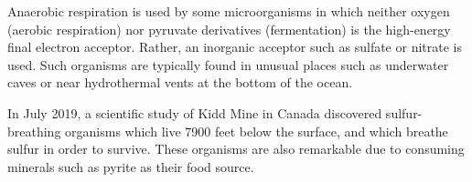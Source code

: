 Anaerobic respiration is used by some microorganisms in which neither oxygen (aerobic respiration) nor pyruvate derivatives (fermentation) is the high-energy final electron acceptor. Rather, an inorganic acceptor such as sulfate or nitrate is used. Such organisms are typically found in unusual places such as underwater caves or near hydrothermal vents at the bottom of the ocean.

In July 2019, a scientific study of Kidd Mine in Canada discovered sulfur-breathing organisms which live 7900 feet below the surface, and which breathe sulfur in order to survive. These organisms are also remarkable due to consuming minerals such as pyrite as their food source.


